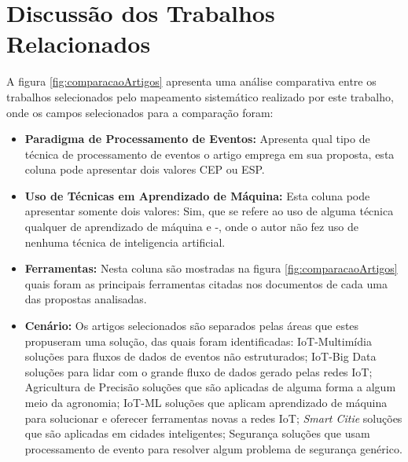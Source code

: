 \documentclass[ti,table]{texufpel} %
\begin{document}
  

  

\section{Discussão dos Trabalhos Relacionados} 

A figura \ref{fig:comparacaoArtigos} apresenta uma análise comparativa entre os trabalhos selecionados pelo mapeamento sistemático realizado por este trabalho, onde os campos selecionados para a comparação foram:  

  

\begin{itemize} 

     

    \item \textbf{Paradigma de Processamento de Eventos:} Apresenta qual tipo de técnica de processamento de eventos o artigo emprega em sua proposta, esta coluna pode apresentar dois valores CEP ou ESP.  

         

     

    \item \textbf{Uso de Técnicas em Aprendizado de Máquina:} Esta coluna pode apresentar somente dois valores: Sim, que se refere ao uso de alguma técnica qualquer de aprendizado de máquina e -, onde o autor não fez uso de nenhuma técnica de inteligencia artificial.  

     

    \item \textbf{Ferramentas:} Nesta coluna são mostradas na figura \ref{fig:comparacaoArtigos} quais foram as principais ferramentas citadas nos documentos de cada uma das propostas analisadas. 

     

    \item \textbf{Cenário:} Os artigos selecionados são separados pelas áreas que estes propuseram uma solução, das quais foram identificadas: IoT-Multimídia soluções para fluxos de dados de eventos não estruturados; IoT-Big Data soluções para lidar com o grande fluxo de dados gerado pelas redes IoT; Agricultura de Precisão soluções que são aplicadas de alguma forma a algum meio da agronomia; IoT-ML soluções que aplicam aprendizado de máquina para solucionar e oferecer ferramentas novas a redes IoT; \textit{Smart Citie} soluções que são aplicadas em cidades inteligentes; Segurança soluções que usam processamento de evento para resolver algum problema de segurança genérico.  


\end{itemize}
\end{document}
